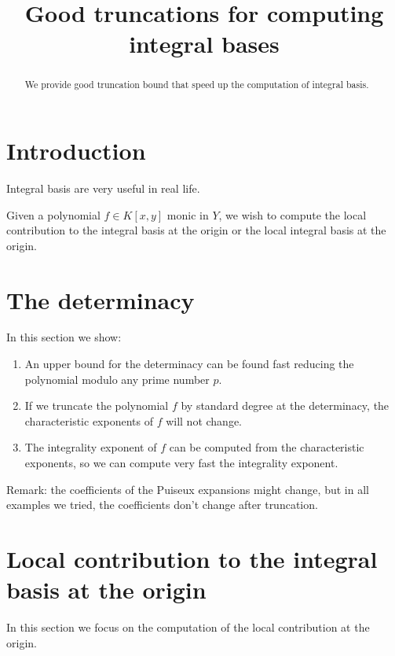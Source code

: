 \documentclass[a4paper,11pt,reqno]{amsart}%
\theoremstyle{definition}
\theoremstyle{plain}
\theoremstyle{remark}
\begin{document}
\title[Good truncations for computing integral bases]{Good truncations for computing integral bases}

\begin{abstract}
We provide good truncation bound that speed up the computation of integral basis.
\end{abstract}
\maketitle

\section{Introduction}
\label{section:introduction}

Integral basis are very useful in real life.

Given a polynomial $f \in K[x,y]$ monic in $Y$, we wish to compute the local contribution to the integral basis at the origin or the local integral basis at the origin.


\section{The determinacy}
\label{section:directApproach}

In this section we show:
\begin{enumerate}
\item An upper bound for the determinacy can be found fast reducing the polynomial modulo any prime number $p$.
\item If we truncate the polynomial $f$ by standard degree at the determinacy, the characteristic exponents of $f$ will not change.
\item The integrality exponent of $f$ can be computed from the characteristic exponents, so we can compute very fast the integrality exponent.
\end{enumerate}

Remark: the coefficients of the Puiseux expansions might change, but in all examples we tried, the coefficients don't change after truncation.

\section{Local contribution to the integral basis at the origin}

In this section we focus on the computation of the local contribution at the origin.
\end{document}
